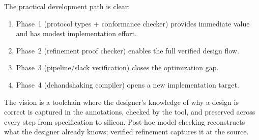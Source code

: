\documentclass[11pt]{article}
\begin{document}
The practical development path is clear:
\begin{enumerate}
\item Phase~1 (protocol types + conformance checker) provides
  immediate value and has modest implementation effort.
\item Phase~2 (refinement proof checker) enables the full verified
  design flow.
\item Phase~3 (pipeline/slack verification) closes the optimization
  gap.
\item Phase~4 (dehandshaking compiler) opens a new implementation
  target.
\end{enumerate}

The vision is a toolchain where the designer's knowledge of why a
design is correct is captured in the annotations, checked by the tool,
and preserved across every step from specification to silicon.
Post-hoc model checking reconstructs what the designer already knows;
verified refinement captures it at the source.
\end{document}
